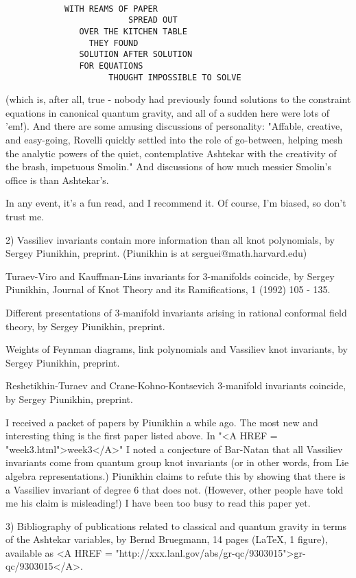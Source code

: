 \begin{verbatim}

			WITH REAMS OF PAPER
            		     SPREAD OUT
		       OVER THE KITCHEN TABLE
			     THEY FOUND
		       SOLUTION AFTER SOLUTION
			   FOR EQUATIONS
                     THOUGHT IMPOSSIBLE TO SOLVE
\end{verbatim}
    

(which is, after all, true - nobody had previously found solutions to
the constraint equations in canonical quantum gravity, and all of a
sudden here were lots of 'em!).  And there are some amusing discussions
of personality: "Affable, creative, and easy-going, Rovelli quickly
settled into the role of go-between, helping mesh the analytic powers of
the quiet, contemplative Ashtekar with the creativity of the brash,
impetuous Smolin."  And discussions of how much messier Smolin's office
is than Ashtekar's. 

In any event, it's a fun read, and I recommend it.  Of course, I'm
biased, so don't trust me.

2) Vassiliev invariants contain more information than all knot
polynomials, by Sergey Piunikhin, preprint.  (Piunikhin is at
serguei@math.harvard.edu) 

Turaev-Viro and Kauffman-Lins invariants for 3-manifolds coincide, by
Sergey Piunikhin, Journal of Knot Theory and its Ramifications, 1 (1992)
105 - 135.

Different presentations of 3-manifold invariants arising in rational
conformal field theory, by Sergey Piunikhin, preprint.

Weights of Feynman diagrams, link polynomials and Vassiliev knot
invariants, by Sergey Piunikhin, preprint.

Reshetikhin-Turaev and Crane-Kohno-Kontsevich 3-manifold invariants
coincide, by Sergey Piunikhin, preprint.

I received a packet of papers by Piunikhin a while ago.  The most new
and interesting thing is the first paper listed above.  In "<A HREF = "week3.html">week3</A>" I noted
a conjecture of Bar-Natan that all Vassiliev invariants come from
quantum group knot invariants (or in other words, from Lie algebra
representations.)  Piunikhin claims to refute this by showing that there
is a Vassiliev invariant of degree 6 that does not.  (However, other
people have told me his claim is misleading!)  I have been too busy to
read this paper yet.   

3)  Bibliography of publications related to classical and quantum
gravity in terms of the Ashtekar variables, by Bernd Bruegmann, 14 pages
(LaTeX, 1 figure), available as <A HREF = "http://xxx.lanl.gov/abs/gr-qc/9303015">gr-qc/9303015</A>.

